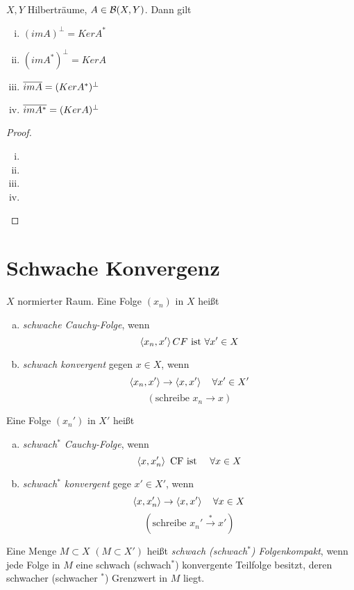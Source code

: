 	\begin{thm}
	\label{3.29}
		$X,Y$ Hilberträume, $A\in \BS$. Dann gilt
			\begin{enumerate}[(i)]
				\item $(imA)^\perp = Ker A^*$
				\item $(imA^*)^\perp = Ker A$
				\item $\overline{imA} = (KerA^*)^\perp$
				\item $\overline{imA^*} = (KerA)^\perp$
			\end{enumerate}
	\end{thm}
	\begin{proof}
		\begin{enumerate}[(i)]
		  \item 
		  \item 
		  \item 
		  \item 
		\end{enumerate}
	\end{proof}
	\section{Schwache Konvergenz}

	\begin{definition}
	\label{def:3.30}
		$X$ normierter Raum. 
		Eine Folge $(x_n)$ in $X$ heißt 
			\begin{enumerate}[a)]
				\item \textit{schwache Cauchy-Folge}, wenn 
					$$ \left \langle x_n,x' \right \rangle CF \text{ ist }  \forall x' \in X$$
				\item \textit{schwach konvergent} gegen $x\in X$, wenn
					$$ \left \langle x_n, x' \right \rangle \to \left \langle x,x' \right \rangle \quad \forall x' \in X'$$
					$$(\text{schreibe } x_n \longrightarrow x )$$
			\end{enumerate}
		Eine Folge $(x_n')$ in $X'$ heißt
			\begin{enumerate}[a)]
				\item \textit{schwach$^*$ Cauchy-Folge}, wenn 
					$$ \left \langle x,x_n' \right \rangle \text{ CF ist } \quad \forall x\in X$$
				\item \textit{schwach$^*$ konvergent} gege $x' \in X'$, wenn
					$$ \left \langle x,x_n' \right \rangle \to \left \langle x,x' \right \rangle \quad \forall x\in X $$
					$$(\text{schreibe } x_n' \overset{*}{\longrightarrow} x')$$
			\end{enumerate}
			Eine Menge $M\subset X$ $(M \subset X')$ heißt \textit{schwach (schwach$^*$) Folgenkompakt}, wenn jede Folge in $M$ eine schwach (schwach$^*$) konvergente Teilfolge besitzt, deren schwacher (schwacher $^*$) Grenzwert in $M$ liegt.
	\end{definition}

